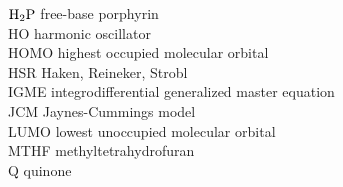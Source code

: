 \documentclass[12pt,twoside,a4paper]{report}
\begin{document}
\begin{tabbing}
${\rm H_2P}$           \> free-base porphyrin\\
HO                    \> harmonic oscillator\\
HOMO                  \> highest occupied molecular orbital\\
HSR                   \> Haken, Reineker, Strobl\\ 
IGME                  \> integrodifferential generalized master equation\\
JCM                   \> Jaynes-Cummings model\\
LUMO                  \> lowest unoccupied molecular orbital\\
MTHF                  \> methyltetrahydrofuran\\
Q                     \> quinone\\

\end{tabbing}
\end{document}
